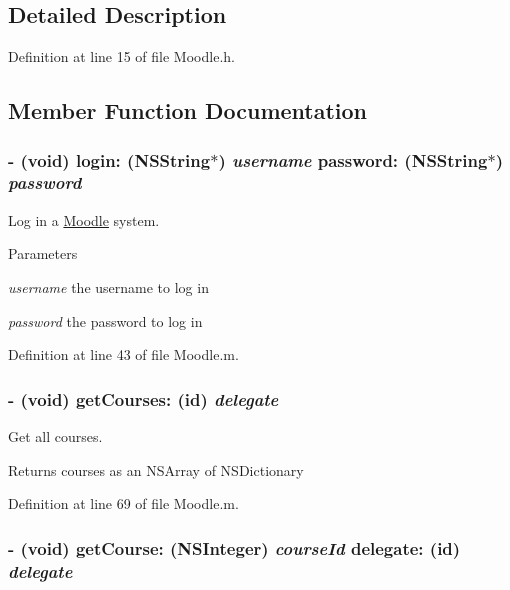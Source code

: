 \subsection{Detailed Description}


Definition at line 15 of file Moodle.h.

\subsection{Member Function Documentation}
\hypertarget{interface_moodle_a9213ffaec574e053426c7889c096ab3d}{
\subsubsection[{login:password:}]{\setlength{\rightskip}{0pt plus 5cm}-\/ (void) login: (NSString$\ast$) {\em username}\/ password: (NSString$\ast$) {\em password}}}
\label{interface_moodle_a9213ffaec574e053426c7889c096ab3d}


Log in a \hyperlink{interface_moodle}{Moodle} system. 
\begin{DoxyParams}{Parameters}
\item[{\em username}]the username to log in \item[{\em password}]the password to log in \end{DoxyParams}


Definition at line 43 of file Moodle.m.\hypertarget{interface_moodle_af557618a5c74a5b786311459499ea850}{
\subsubsection[{getCourses:}]{\setlength{\rightskip}{0pt plus 5cm}-\/ (void) getCourses: (id) {\em delegate}}}
\label{interface_moodle_af557618a5c74a5b786311459499ea850}


Get all courses. \begin{DoxyReturn}{Returns}
courses as an NSArray of NSDictionary 
\end{DoxyReturn}


Definition at line 69 of file Moodle.m.\hypertarget{interface_moodle_a305417edc7b5fd47e19d8e7d888af614}{
\subsubsection[{getCourse:delegate:}]{\setlength{\rightskip}{0pt plus 5cm}-\/ (void) getCourse: (NSInteger) {\em courseId}\/ delegate: (id) {\em delegate}}}
\label{interface_moodle_a305417edc7b5fd47e19d8e7d888af614}


